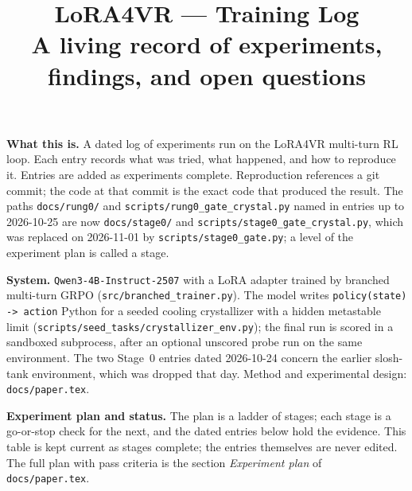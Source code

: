 \documentclass[11pt,a4paper]{article}
\title{\textbf{LoRA4VR --- Training Log}\\
\normalsize A living record of experiments, findings, and open questions}
\author{}
\date{}
\begin{document}
\maketitle

\noindent\textbf{What this is.}
A dated log of experiments run on the LoRA4VR multi-turn RL loop. Each entry
records what was tried, what happened, and how to reproduce it. Entries are
added as experiments complete. Reproduction references a git commit; the code
at that commit is the exact code that produced the result. The paths
\texttt{docs/rung0/} and \texttt{scripts/rung0\_gate\_crystal.py} named in
entries up to 2026-10-25 are now \texttt{docs/stage0/} and
\texttt{scripts/stage0\_gate\_crystal.py}, which was replaced on 2026-11-01 by
\texttt{scripts/stage0\_gate.py}; a level of the experiment plan is called a
stage.

\noindent\textbf{System.} \texttt{Qwen3-4B-Instruct-2507} with a LoRA adapter
trained by branched multi-turn GRPO (\texttt{src/branched\_trainer.py}). The
model writes \texttt{policy(state) -> action} Python for a seeded cooling
crystallizer with a hidden metastable limit
(\texttt{scripts/seed\_tasks/crystallizer\_env.py}); the final run is scored
in a sandboxed subprocess, after an optional unscored probe run on the same
environment. The two Stage~0 entries dated 2026-10-24 concern the earlier
slosh-tank environment, which was dropped that day. Method and experimental
design: \texttt{docs/paper.tex}.


\noindent\textbf{Experiment plan and status.} The plan is a ladder of stages;
each stage is a go-or-stop check for the next, and the dated entries below
hold the evidence. This table is kept current as stages complete; the entries
themselves are never edited. The full plan with pass criteria is the section
\emph{Experiment plan} of \texttt{docs/paper.tex}.
\end{document}

